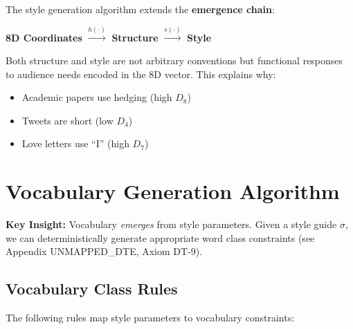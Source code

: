 \begin{tcolorbox}[colback=yellow!5!white, colframe=yellow!75!black,
    title=Key Insight: Emergent Style]

The style generation algorithm extends the \textbf{emergence chain}:

\begin{center}
\textbf{8D Coordinates} $\xrightarrow{h(\cdot)}$ \textbf{Structure} $\xrightarrow{s(\cdot)}$ \textbf{Style}
\end{center}

Both structure and style are not arbitrary conventions but functional responses
to audience needs encoded in the 8D vector. This explains why:
\begin{itemize}[nosep]
\item Academic papers use hedging (high $D_8$)
\item Tweets are short (low $D_4$)
\item Love letters use ``I'' (high $D_7$)
\end{itemize}

\end{tcolorbox}


\section{Vocabulary Generation Algorithm}
\label{sec:doctype-vocabulary}

\textbf{Key Insight:} Vocabulary \textit{emerges} from style parameters.
Given a style guide $\sigma$, we can deterministically generate appropriate
word class constraints (see Appendix UNMAPPED_DTE, Axiom DT-9).

\subsection{Vocabulary Class Rules}

The following rules map style parameters to vocabulary constraints:

